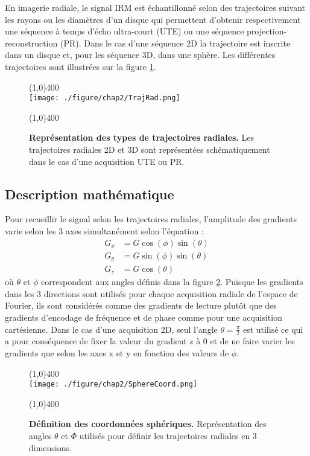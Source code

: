 En imagerie radiale, le signal IRM est échantillonné selon des trajectoires suivant les rayons ou les diamètres d'un disque qui permettent d'obtenir respectivement une séquence à temps d'écho ultra-court (UTE) ou une séquence projection-reconstruction (PR). Dans le cas d'une séquence 2D la trajectoire est inscrite dans un disque et, pour les séquence 3D, dans une sphère. Les différentes trajectoires sont illustrées sur la figure \ref{fig:TrajRad}.

\begin{figure}[H]
\centering
\line(1,0){400} \\
\texttt{[image: ./figure/chap2/TrajRad.png]}
\caption[Représentation des types de trajectoires radiales.]{\label{fig:TrajRad} \textbf{Représentation des types de trajectoires radiales.} Les trajectoires radiales 2D et 3D sont représentées schématiquement dans le cas d'une acquisition UTE ou PR.}
\line(1,0){400} \\
\end{figure}




\subsection{Description mathématique}

Pour recueillir le signal selon les trajectoires radiales, l'amplitude des gradients varie selon les 3 axes simultanément selon l'équation :
\begin{equation}
\label{eq:AngleRadial}
\begin{split}
	G_x & =G\cos(\phi)\sin(\theta)\\
	G_y & =G\sin(\phi)\sin(\theta)\\	
	G_z & =G\cos(\theta)
\end{split}
\end{equation}
où $\theta$ et $\phi$ correspondent aux angles définis dans la figure \ref{fig:SphereCoord}.
Puisque les gradients dans les 3 directions sont utilisés pour chaque acquisition radiale de l'espace de Fourier, ils sont considérés comme des gradients de lecture plutôt que des gradients d'encodage de fréquence et de phase comme pour une acquisition cartésienne. Dans le cas d'une acquisition 2D, seul l'angle $\theta = \frac{\pi}{2}$ est utilisé ce qui a pour conséquence de fixer la valeur du gradient z à 0 et de ne faire varier les gradients que selon les axes x et y en fonction des valeurs de $\phi$.

\begin{figure} [H]
\centering
\line(1,0){400} \\
\texttt{[image: ./figure/chap2/SphereCoord.png]}
\caption[Définition des coordonnées sphériques.]{\label{fig:SphereCoord} \textbf{Définition des coordonnées sphériques.} Représentation des angles $\theta$ et $\Phi$ utilisés  pour définir les trajectoires radiales en 3 dimensions.}
\line(1,0){400} \\
\end{figure}

